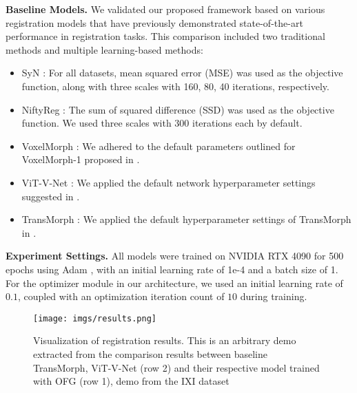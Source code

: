 \documentclass[10pt,twocolumn,letterpaper]{article}
\begin{document}
\textbf{Baseline Models.} We validated our proposed framework based on various registration models that have previously demonstrated state-of-the-art performance in registration tasks. This comparison included two traditional methods and multiple learning-based methods:
\begin{itemize}
    \item SyN \cite{AVANTS200826}: For all datasets, mean squared error (MSE) was used as the objective function, along with three scales with 160, 80, 40 iterations, respectively.
    \item NiftyReg \cite{niftyreg}: The sum of squared difference (SSD) was used as the objective function. We used three scales with 300 iterations each by default.
    \item VoxelMorph \cite{Balakrishnan_2019}: We adhered to the default parameters outlined for VoxelMorph-1 proposed in \cite{Balakrishnan_2019}.
    \item ViT-V-Net \cite{chen2021vitvnet}: We applied the default network hyperparameter settings suggested in \cite{chen2021vitvnet}.
    \item TransMorph \cite{Chen_2022}: We applied the default hyperparameter settings of TransMorph in \cite{Chen_2022}.
\end{itemize}

\textbf{Experiment Settings.} All models were trained on NVIDIA RTX 4090 for 500 epochs using Adam \cite{adam2014arx}, with an initial learning rate of 1e-4 and a batch size of 1. 
For the optimizer module in our architecture, we used an initial learning rate of $0.1$, coupled with an optimization iteration count of $10$ during training.























\begin{figure*}[t]
    \label{fig:results}
    \begin{center}
       \texttt{[image: imgs/results.png]}
    \end{center}
    \caption{Visualization of registration results. This is an arbitrary demo extracted from the comparison results between baseline TransMorph, ViT-V-Net (row 2) and their respective model trained with OFG (row 1), demo from the IXI dataset \cite{ixi}}
    \label{fig:vis-results}
\end{figure*}
\end{document}
